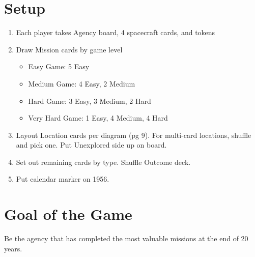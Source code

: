 \documentclass[12pt]{article}
\newenvironment{enumerateCustom}
{\begin{enumerate}
  \setlength{\itemsep}{1pt}
  \setlength{\parskip}{0pt}
  \setlength{\parsep}{0pt}}
{\end{enumerate}}
\newenvironment{itemizeCustom}
{\begin{itemize}
  \setlength{\itemsep}{1pt}
  \setlength{\parskip}{0pt}
  \setlength{\parsep}{0pt}}
{\end{itemize}}
\begin{document}
\begin{multicols*}{2}

\section*{Setup}
    \begin{enumerateCustom}
        \item Each player takes Agency board, 4 spacecraft cards, and tokens
        \item Draw Mission cards by game level
            \begin{itemizeCustom}
                \item Easy Game: 5 Easy
                \item Medium Game: 4 Easy, 2 Medium
                \item Hard Game: 3 Easy, 3 Medium, 2 Hard
                \item Very Hard Game: 1 Easy, 4 Medium, 4 Hard
            \end{itemizeCustom}
        \item Layout Location cards per diagram (pg 9). For multi-card locations, shuffle and pick one. Put Unexplored side up on board.
        \item Set out remaining cards by type. Shuffle Outcome deck.
        \item Put calendar marker on 1956.
    \end{enumerateCustom}

\section*{Goal of the Game}
Be the agency that has completed the most valuable missions at the end of 20 years.


\end{multicols*}
\end{document}
